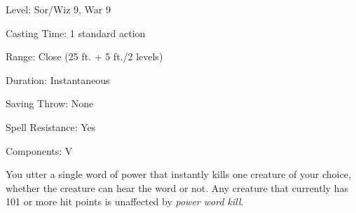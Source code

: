 
\begin{description*}
\item[Level:] Sor/Wiz 9, War 9
\item[Casting Time:] 1 standard action
\item[Range:] Close (25 ft. + 5 ft./2 levels)
\item[Duration:] Instantaneous
\item[Saving Throw:] None
\item[Spell Resistance:] Yes
\item[Components:] V
\end{description*}

You utter a single word of power that instantly kills one creature of your choice,
whether the creature can hear the word or not. Any creature that currently has
101 or more hit points is unaffected by \textit{power word kill}.